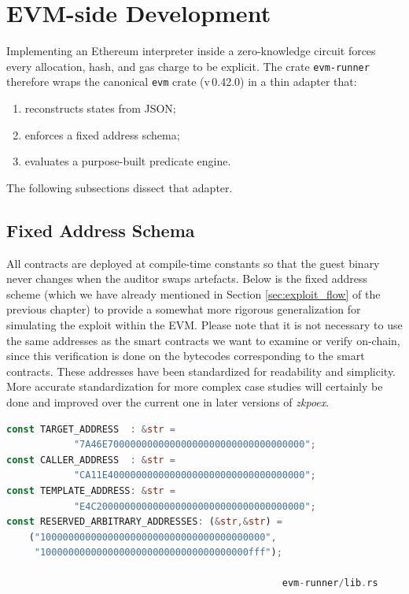 \section{EVM-side Development}

Implementing an Ethereum interpreter inside a zero-knowledge circuit forces every allocation, hash, and gas charge to be explicit. The crate \texttt{evm-runner} therefore wraps the canonical \texttt{evm} crate (v\,0.42.0) in a thin adapter that:
\begin{enumerate}[label=(\roman*)]
    \item reconstructs states from JSON;
    \item enforces a fixed address schema;
    \item evaluates a purpose-built predicate engine.
\end{enumerate}
The following subsections dissect that adapter.

\subsection{Fixed Address Schema}

All contracts are deployed at compile-time constants so that the guest binary
never changes when the auditor swaps artefacts. Below is the fixed address scheme (which we have already mentioned in Section \ref{sec:exploit_flow} of the previous chapter) to provide a somewhat more rigorous generalization for simulating the exploit within the EVM. Please note that it is not necessary to use the same addresses as the smart contracts we want to examine or verify on-chain, since this verification is done on the bytecodes corresponding to the smart contracts. These addresses have been standardized for readability and simplicity. More accurate standardization for more complex case studies will certainly be done and improved over the current one in later versions of \textit{zkpoex}.

\begin{lstlisting}[caption={[Static address map]},language=Rust]
const TARGET_ADDRESS  : &str = 
            "7A46E70000000000000000000000000000000000";
const CALLER_ADDRESS  : &str = 
            "CA11E40000000000000000000000000000000000";
const TEMPLATE_ADDRESS: &str = 
            "E4C2000000000000000000000000000000000000";
const RESERVED_ARBITRARY_ADDRESSES: (&str,&str) =
    ("1000000000000000000000000000000000000000",
     "1000000000000000000000000000000000000fff");
     
                                                 evm-runner/lib.rs
\end{lstlisting}

